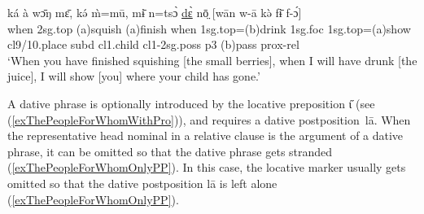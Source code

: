 \documentclass[10pt,twoside]{article}
\def\ci#1{{\ipaFont #1}}
\newcommand{\gl}[1]{`#1'}
\def\VSP{\vspace{0pt}}
\newcommand{\cl}[1]{{\sc cl#1}}
\newcommand{\pref}[1]{(\ref{#1})}
\def\ih{ɩ}
\newcommand{\comment}[1]{\textcolor{blue}{\emph{#1}}}
\begin{document}
\begin{exe}
	\ex \label{exWhenYouHaveFinishedSquishing} 		
		\gll ká à wɔ̄ŋ mɛ̄, kə́ m̀=mū, mɨ̄ n=tsɔ̀ \uline{dɛ̀} nō̤ [wān w-ā kə̀ fɨ̄ f-ɔ́]	\\
		when	{\sc 2sg.top}	({\sc a})squish	({\sc a})finish		when	{\sc 1sg.top}=({\sc b})drink	{\sc 1sg.foc}	{\sc 1sg.top}=({\sc a})show	\cl9/10.place	{\sc subd}			\cl1.child		\cl1-{\sc 2sg.poss}	{\sc p3}	({\sc b})pass	{\sc prox}-{\sc rel}	\\
		\glt \VSP \gl{When you have finished squishing [the small berries], when I will have drunk [the juice], I will show [you] where your child has gone.}
\end{exe}%

A dative phrase is optionally introduced by the locative preposition \ci{\H\ih} (see \pref{exThePeopleForWhomWithPro}),
and requires a dative postposition~\ci{l\=a}. 
When the representative head nominal in a relative clause is the argument of a dative phrase, it 
can be omitted so that the dative phrase gets stranded \pref{exThePeopleForWhomOnlyPP}. In this 
case, the locative marker \ci{{\H\ih}} usually gets omitted so that the dative postposition \ci{lā} 
is left alone \pref{exThePeopleForWhomOnlyPP}.
\end{document}
